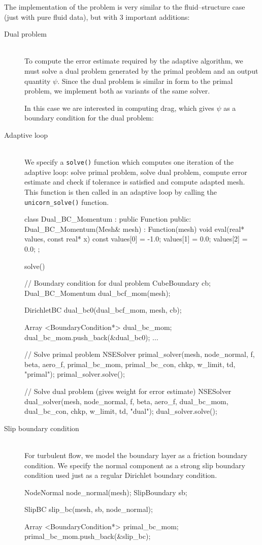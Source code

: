 The implementation of the problem is
very similar to the fluid--structure case (just with pure fluid data),
but with 3 important additions:
\begin{description}
\item[Dual problem] \ \\ To compute the error estimate required by the
  adaptive algorithm, we must solve a dual problem generated by the
  primal problem and an output quantity $\psi$. Since the dual problem
  is similar in form to the primal problem, we implement both as
  variants of the same solver.

In this case we are interested in computing drag, which gives $\psi$
as a boundary condition for the dual problem:

\item[Adaptive loop] \ \\ We specify a {\tt solve()} function which computes one
  iteration of the adaptive loop: solve primal problem, solve dual
  problem, compute error estimate and check if tolerance is satisfied
  and compute adapted mesh. This function is then called in an
  adaptive loop by calling the {\tt unicorn\_solve()} function.

\begin{c++}
class Dual_BC_Momentum : public Function
{
public:
  Dual_BC_Momentum(Mesh& mesh) : Function(mesh) {}
  void eval(real* values, const real* x) const
  {
    values[0] = -1.0;
    values[1] = 0.0;
    values[2] = 0.0;
  }
};

solve()
{
  // Boundary condition for dual problem
  CubeBoundary cb;
  Dual_BC_Momentum dual_bcf_mom(mesh);

  DirichletBC dual_bc0(dual_bcf_mom, mesh, cb);

  Array <BoundaryCondition*> dual_bc_mom;
  dual_bc_mom.push_back(&dual_bc0);
  ...


  // Solve primal problem
  NSESolver primal_solver(mesh, node_normal, f, beta, aero_f, primal_bc_mom, primal_bc_con,
    chkp, w_limit, td, "primal");
  primal_solver.solve();

  // Solve dual problem (gives weight for error estimate)
  NSESolver dual_solver(mesh, node_normal, f, beta, aero_f, dual_bc_mom, dual_bc_con,
    chkp, w_limit, td, "dual");
  dual_solver.solve();
}

\end{c++}

\item[Slip boundary condition] \ \\ For turbulent flow, we model the
  boundary layer as a friction boundary condition. We specify the
  normal component as a strong slip boundary condition used just as a
  regular Dirichlet boundary condition.
\begin{c++}
NodeNormal node_normal(mesh);
SlipBoundary sb;

SlipBC slip_bc(mesh, sb, node_normal);

Array <BoundaryCondition*> primal_bc_mom;
primal_bc_mom.push_back(&slip_bc);
\end{c++}

\end{description}

